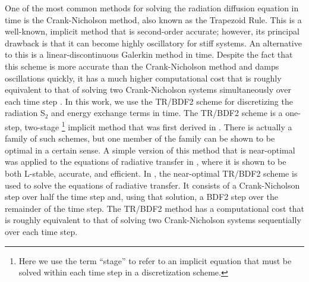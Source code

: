 \documentclass[preprint,12pt]{elsarticle}
\begin{document}
One of the most common methods for solving the radiation diffusion equation in time is the Crank-Nicholson method, also known as the Trapezoid Rule.  This is a well-known, implicit method that is second-order accurate; however, its principal drawback is that it can become highly oscillatory for stiff systems.  An alternative to this is a linear-discontinuous Galerkin method in time.  Despite the fact that this scheme is more accurate than the Crank-Nicholson method and damps oscillations quickly, it has a much higher computational cost that is roughly equivalent to that of solving two Crank-Nicholson systems simultaneously over each time step \cite{wareing}.  In this work, we use the TR/BDF2 scheme for discretizing the radiation S$_2$ and energy exchange terms in time.  The TR/BDF2 scheme is a one-step, two-stage \footnote{Here we use the term ``stage'' to refer to an implicit equation that must be solved within each time step in a discretization scheme.} implicit method that was first derived in \cite{bank}.   There is actually a family of such schemes, but one member of the family can be shown to be optimal in a certain sense.  A simple version of this method that is near-optimal was applied to the equations of radiative transfer in \cite{me}, where it is shown to be both L-stable, accurate, and efficient.  In \cite{me}, the near-optimal TR/BDF2 scheme is used to solve the equations of radiative transfer. It consists of a Crank-Nicholson step over half the time step and, using that solution, a BDF2 step over the remainder of the time step.  The TR/BDF2 method has a computational cost that is roughly equivalent to that of solving two Crank-Nicholson systems sequentially over each time step.
\end{document}
